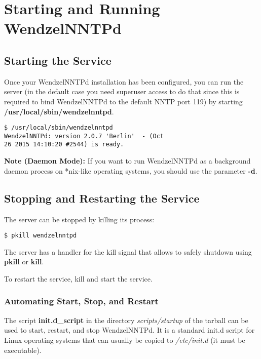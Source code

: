 \chapter{Starting and Running WendzelNNTPd}

\section{Starting the Service}

Once your WendzelNNTPd installation has been configured, you can run the server (in the default case you need superuser access to do that since this is required to bind WendzelNNTPd to the default NNTP port 119) by starting \textbf{/usr/local/sbin/wendzelnntpd}.

\begin{verbatim}
$ /usr/local/sbin/wendzelnntpd 
WendzelNNTPd: version 2.0.7 'Berlin'  - (Oct
26 2015 14:10:20 #2544) is ready.
\end{verbatim}

\textbf{Note (Daemon Mode):} If you want to run WendzelNNTPd as a background daemon process on *nix-like operating systems, you should use the parameter \textbf{-d}.

\section{Stopping and Restarting the Service}

The server can be stopped by killing its process:

\begin{verbatim}
$ pkill wendzelnntpd
\end{verbatim}

The server has a handler for the kill signal that allows to safely shutdown using \textbf{pkill} or \textbf{kill}.

To restart the service, kill and start the service.

\subsection{Automating Start, Stop, and Restart}

The script \textbf{init.d\_script} in the directory \textit{scripts/startup} of the tarball can be used to start, restart, and stop WendzelNNTPd. It is a standard init.d script for Linux operating systems that can usually be copied to \textit{/etc/init.d} (it must be executable).

